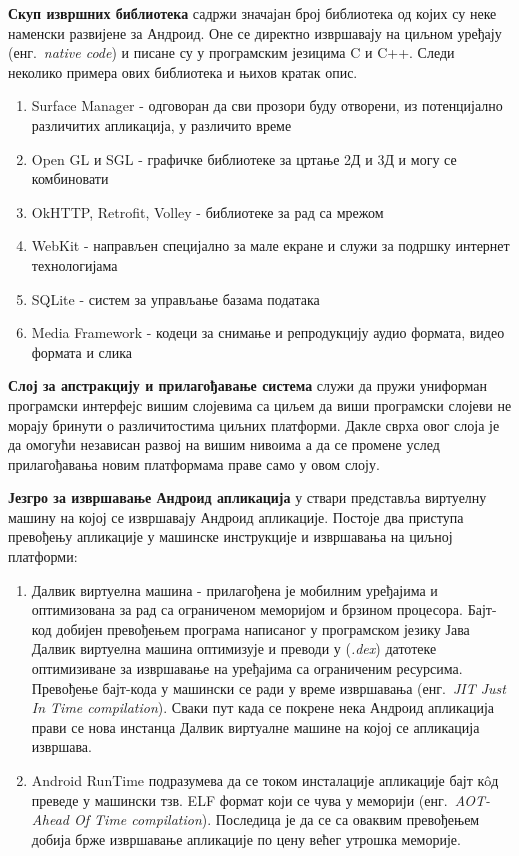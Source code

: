\documentclass[12pt,oneside]{memoir}
\theoremstyle{remark}
\begin{document}
\textbf{Скуп извршних библиотека} садржи значајан број библиотека од којих су неке наменски развијене за Андроид. Оне се директно извршавају на циљном уређају (енг.~{\em native code}) и писане су у програмским језицима C и C++.  Следи неколико примера ових библиотека и њихов кратак опис. \\
\begin{enumerate}
\item Surface Manager - одговоран да сви прозори буду отворени, из потенцијално различитих апликација, у различито време
\item Open GL и SGL - графичке библиотеке за цртање 2Д и 3Д и могу се комбиновати 
\item OkHTTP,  Retrofit, Volley - библиотеке за рад са мрежом
\item WebKit - направљен специјално за мале екране и служи за подршку интернет технологијама
\item SQLite - систем за управљање базама података
\item Media Framework - кодеци за снимање и репродукцију аудио формата, видео формата и слика
\end{enumerate}


\textbf{Слој за апстракцију и прилагођавање система} служи да пружи униформан програмски интерфејс вишим слојевима са циљем да виши програмски слојеви не морају бринути о различитостима циљних платформи. Дакле сврха овог слоја је да омогући независан развој на вишим нивоима а да се промене услед прилагођавања новим платформама праве само у овом слоју.


\textbf{Језгро за извршавање Андроид апликација} у ствари представља виртуелну машину на којој се извршавају Андроид апликације. Постоје два приступа превођењу апликације у машинске инструкције и извршавања на циљној платформи:
\begin{enumerate}
\item Далвик виртуелна машина - прилагођена је мобилним уређајима и оптимизована за рад са ограниченом меморијом и брзином процесора. Бајт-код добијен превођењем програма написаног у програмском језику Јава Далвик виртуелна машина оптимизује и преводи у  ({\em *.dex}) датотеке оптимизиване за извршавање на уређајима са ограниченим ресурсима. Превођење бајт-кода у машински се ради у време извршавања (енг.~{\em JIT Just In Time compilation}). Сваки пут када се покрене нека Андроид апликација прави се нова инстанца Далвик виртуалне машине на којој се апликација извршава.
\item Android RunTime подразумева да се током инсталације апликације бајт к\^{o}д преведе у машински тзв. ELF формат који се чува у меморији  (енг.~{\em AOT-Ahead Of Time compilation}). Последица је да се са оваквим превођењем добија брже извршавање апликације по цену већег утрошка меморије.
\end{enumerate}
\end{document}
